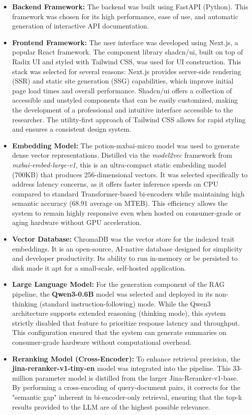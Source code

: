 \documentclass[journal]{./IEEE/IEEEtran}
\begin{document}
\begin{itemize}
    \item \textbf{Backend Framework:} The backend was built using FastAPI (Python). This framework was chosen for its high performance, ease of use, and automatic generation of interactive API documentation.
    \item \textbf{Frontend Framework:} The user interface was developed using Next.js, a popular React framework. The component library shadcn/ui, built on top of Radix UI and styled with Tailwind CSS, was used for UI construction. This stack was selected for several reasons: Next.js provides server-side rendering (SSR) and static site generation (SSG) capabilities, which improve initial page load times and overall performance. Shadcn/ui offers a collection of accessible and unstyled components that can be easily customized, making the development of a professional and intuitive interface accessible to the researcher. The utility-first approach of Tailwind CSS allows for rapid styling and ensures a consistent design system.
    \item \textbf{Embedding Model:} The potion-mxbai-micro model was used to generate dense vector representations. Distilled via the \textit{model2vec} framework from \textit{mxbai-embed-large-v1}, this is an ultra-compact static embedding model (700KB) that produces 256-dimensional vectors. It was selected specifically to address latency concerns, as it offers faster inference speeds on CPU compared to standard Transformer-based bi-encoders while maintaining high semantic accuracy (68.91 average on MTEB). This efficiency allows the system to remain highly responsive even when hosted on consumer-grade or aging hardware without GPU acceleration.
    \item \textbf{Vector Database:} ChromaDB was the vector store for the indexed trait embeddings. It is an open-source, AI-native database designed for simplicity and developer productivity. Its ability to run in-memory or be persisted to disk made it apt for a small-scale, self-hosted application.
    \item \textbf{Large Language Model:} For the generation component of the RAG pipeline, the \textbf{Qwen3-0.6B} model was selected and deployed in its non-thinking (standard instruction-following) mode. While the Qwen3 architecture supports extended reasoning (thinking mode), this system strictly disabled that feature to prioritize response latency and throughput.  This configuration ensured that the system can generate summaries on consumer-grade hardware without computational overhead.
    \item \textbf{Reranking Model (Cross-Encoder):} To enhance retrieval precision, the \textbf{jina-reranker-v1-tiny-en} model was integrated into the pipeline. This 33-million parameter model is distilled from the larger Jina-Reranker-v1-base. By performing a cross-encoding of query-document pairs, it corrects for the "semantic gap" inherent in bi-encoder-only retrieval, ensuring that the top-k results provided to the LLM are of the highest possible relevance.
\end{itemize}
\end{document}
